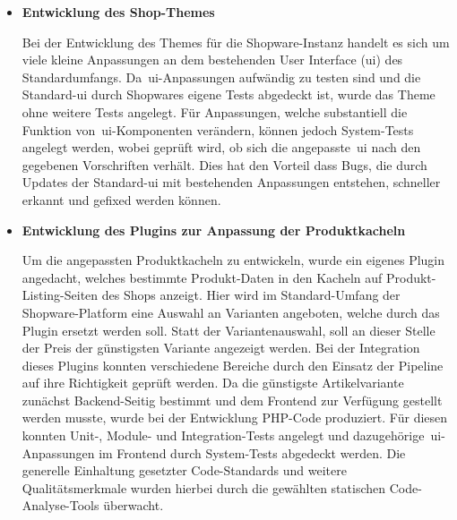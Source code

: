 \begin{itemize}
    \item {
        \textbf{Entwicklung des Shop-Themes}\par
        Bei der Entwicklung des Themes für die Shopware-Instanz handelt es sich um viele kleine Anpassungen an dem
        bestehenden User Interface (\acrshort{ui}) des Standardumfangs.
        Da\ \acrshort{ui}-Anpassungen aufwändig zu testen sind und die Standard-\acrshort{ui} durch
        Shopwares eigene Tests abgedeckt ist, wurde das Theme ohne weitere Tests angelegt.
        Für Anpassungen, welche substantiell die Funktion von\ \acrshort{ui}-Komponenten verändern, können jedoch
        System-Tests angelegt werden, wobei geprüft wird, ob sich die angepasste\ \acrshort{ui} nach den gegebenen
        Vorschriften verhält.
        Dies hat den Vorteil dass Bugs, die durch Updates der Standard-\acrshort{ui} mit bestehenden Anpassungen
        entstehen, schneller erkannt und gefixed werden können.
    }

    \item {
        \textbf{Entwicklung des Plugins zur Anpassung der Produktkacheln}\par
        Um die angepassten Produktkacheln zu entwickeln, wurde ein eigenes Plugin angedacht, welches bestimmte
        Produkt-Daten in den Kacheln auf Produkt-Listing-Seiten des Shops anzeigt.
        Hier wird im Standard-Umfang der Shopware-Platform eine Auswahl an Varianten angeboten, welche durch das
        Plugin ersetzt werden soll.
        Statt der Variantenauswahl, soll an dieser Stelle der Preis der günstigsten Variante angezeigt werden.
        Bei der Integration dieses Plugins konnten verschiedene Bereiche durch den Einsatz der Pipeline auf ihre
        Richtigkeit geprüft werden.
        Da die günstigste Artikelvariante zunächst Backend-Seitig bestimmt und dem Frontend zur Verfügung
        gestellt werden musste, wurde bei der Entwicklung PHP-Code produziert.
        Für diesen konnten Unit-, Module- und Integration-Tests angelegt und dazugehörige\ \acrshort{ui}-Anpassungen
        im Frontend durch System-Tests abgedeckt werden.
        Die generelle Einhaltung gesetzter Code-Standards und weitere Qualitätsmerkmale wurden hierbei durch die
        gewählten statischen Code-Analyse-Tools überwacht.
    }


\end{itemize}
